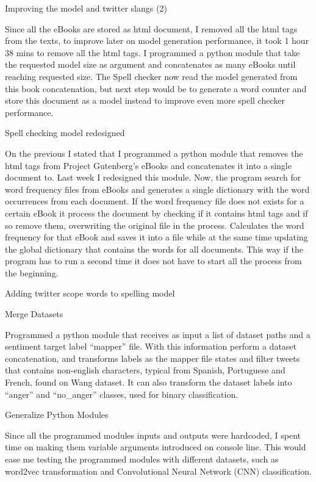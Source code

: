 Improving the model and twitter slangs (2)

Since all the eBooks are stored as \acrfull{html} document, I removed all the \acrshort{html} tags from the texts, to improve later on model generation performance, it took 1 hour 38 mins to remove all the \acrshort{html} tags.
I programmed a python module that take the requested model size as argument and concatenates as many eBooks until reaching requested size.
The Spell checker now read the model generated from this book concatenation, but next step would be to generate a word counter and store this document as a model instead to improve even more spell checker performance.

Spell checking model redesigned

On the previous I stated that I programmed a python module that removes the \acrshort{html} tags from Project Gutenberg's eBooks and concatenates it into a single document to. Last week I redesigned this module.
Now, the program search for word frequency files from eBooks and generates a single dictionary with the word occurrences from each document.
If the word frequency file does not exists for a certain eBook it process the document by checking if it contains \acrshort{html} tags and if so remove them, overwriting the original file in the process.
Calculates the word frequency for that eBook and saves it into a file while at the same time updating the global dictionary that contains the words for all documents.
This way if the program has to run a second time it does not have to start all the process from the beginning.

Adding twitter scope words to spelling model

Merge Datasets

Programmed a python module that receives as input a list of dataset paths and a sentiment target label “mapper” file. 
With this information perform a dataset concatenation, and transforms labels as the mapper file states and filter tweets that contains non-english characters, typical from Spanish, Portuguese and French, found on Wang dataset.
It can also transform the dataset labels into “anger” and “no\_anger” classes, used for binary classification.

Generalize Python Modules

Since all the programmed modules inputs and outputs were hardcoded, I spent time on making them variable arguments introduced on console line.
This would ease me testing the programmed modules with different datasets, such as word2vec transformation and Convolutional Neural Network (CNN) classification.

